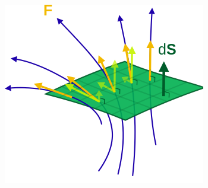 \begin {figure}[h!]
 \centering
            \includegraphics[width=0.45\linewidth]{flux.png}
            \caption*{}
\end {figure}




